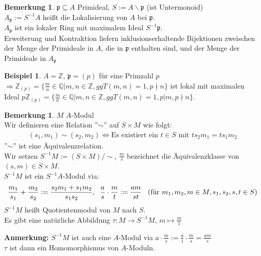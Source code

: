\documentclass[10pt,a4paper,numbers=endperiod]{scrreprt}
\theoremstyle{definition}
\newtheorem{bem}[satz]{Bemerkung}
\newtheorem{bsp}[satz]{Beispiel}
\def\QQ{{\mathbb Q}}
\def\ZZ{{\mathbb Z}}
\begin{document}
\begin{bem}
	$\mathfrak{p} \subseteq A$ Primideal, $S := A \backslash \mathfrak{p}$ (ist Untermonoid)\\
	$A_{\mathfrak{p}} := S^{-1}A$ heißt die Lokalisierung von $A$ bei $\mathfrak{p}$.\\
	$A_{\mathfrak{p}}$ ist ein lokaler Ring mit maximalem Ideal $S^{-1}\mathfrak{p}$.\\
	Erweiterung und Kontraktion liefern inklusionserhaltende Bijektionen zweischen der Menge der Primideale in $A$, die in $\mathfrak{p}$ enthalten sind, und der Menge der Primideale in $A_{\mathfrak{p}}$
\end{bem}

\begin{bsp}
	$A = \ZZ$, $\mathfrak{p} = (p)$ für eine Primzahl $p$\\
	$\Rightarrow \ZZ_{(p)} = \{\frac{m}{n} \in \QQ| m, n \in \ZZ, ggT(m, n) = 1, p \nmid n\}$ ist lokal mit maximalen Ideal $p\ZZ_{(p)} = \{\frac{m}{n} \in \QQ| m, n \in \ZZ, ggT(m, n) = 1, p|m, p \nmid n\}$. 
\end{bsp}

\begin{bem}
	$M$ $A$-Modul\\
	Wir definieren eine Relation ''$\sim$'' auf $S \times M$ wie folgt: \begin{align*}
		(s_1, m_1) \sim (s_2, m_2) \Leftrightarrow \text{Es existiert ein } t \in S \text{ mit } ts_2m_1 = ts_1m_2
	\end{align*}
	''$\sim$'' ist eine Äquivalenzrelation.\\
	Wir setzen $S^{-1}M := (S \times M)/\sim$, $\frac{m}{s}$ bezeichnet die Äquivalenzklasse von $(s, m) \in S \times M$.\\
	$S^{-1}M$ ist ein $S^{-1}A$-Modul via: \begin{align*}
		\frac{m_1}{s_1} + \frac{m_2}{s_2} := \frac{s_2m_1 + s_1m_2}{s_1s_2}, \hspace*{2mm} \frac{a}{s} \cdot \frac{m}{t} := \frac{am}{st} \hspace*{3mm} (\text{für } m_1, m_2, m \in M, s_1, s_2, s, t \in S)
	\end{align*}
	$S^{-1}M$ heißt Quotientenmodul von $M$ nach $S$.\\
	Es gibt eine natürliche Abbildung $\tau: M \to S^{-1}M$, $m \mapsto \frac{m}{1}$
\end{bem}

\textbf{Anmerkung:} $S^{-1}M$ ist auch eine $A$-Modul via $a \cdot \frac{m}{s} := \frac{a}{1} \cdot \frac{m}{s} = \frac{am}{s}$\\
$\tau$ ist dann ein Homomorphismus von $A$-Moduln.
\end{document}
